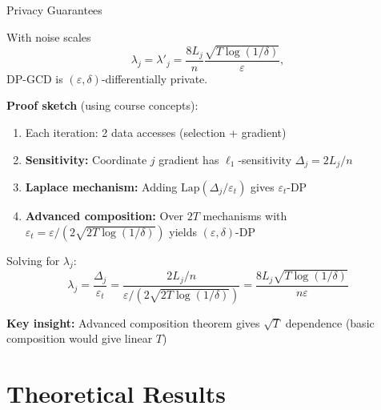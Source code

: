 \documentclass{beamer}
\begin{document}
\begin{frame}{Privacy Guarantees}
\begin{theorem}
With noise scales
\[
\lambda_j = \lambda'_j = \frac{8 L_j}{n} \frac{\sqrt{T \log(1/\delta)}}{\varepsilon},
\]
DP-GCD is $(\varepsilon, \delta)$-differentially private.
\end{theorem}

\vspace{0.5em}

\textbf{Proof sketch} (using course concepts):
\begin{enumerate}
\item Each iteration: 2 data accesses (selection + gradient)
\item \textbf{Sensitivity:} Coordinate $j$ gradient has $\ell_1$-sensitivity $\Delta_j = 2L_j/n$
\item \textbf{Laplace mechanism:} Adding $\mathrm{Lap}(\Delta_j/\varepsilon_t)$ gives $\varepsilon_t$-DP
\item \textbf{Advanced composition:} Over $2T$ mechanisms with $\varepsilon_t = \varepsilon/(2\sqrt{2T\log(1/\delta)})$ yields $(\varepsilon, \delta)$-DP
\end{enumerate}

\vspace{0.5em}

Solving for $\lambda_j$:
\[
\lambda_j = \frac{\Delta_j}{\varepsilon_t} = \frac{2L_j/n}{\varepsilon/(2\sqrt{2T\log(1/\delta)})} = \frac{8L_j\sqrt{T\log(1/\delta)}}{n\varepsilon}
\]

\vspace{0.3em}

\textbf{Key insight:} Advanced composition theorem gives $\sqrt{T}$ dependence (basic composition would give linear $T$)
\end{frame}

\section{Theoretical Results}
\end{document}

